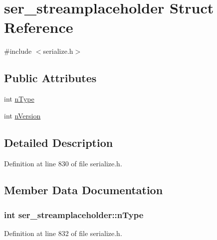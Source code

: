 \hypertarget{structser__streamplaceholder}{}\section{ser\+\_\+streamplaceholder Struct Reference}
\label{structser__streamplaceholder}


{\ttfamily \#include $<$serialize.\+h$>$}

\subsection*{Public Attributes}
\begin{DoxyCompactItemize}
\item 
int \hyperlink{structser__streamplaceholder_a789184cb41dc03b494be3ea0d83d3c3c}{n\+Type}
\item 
int \hyperlink{structser__streamplaceholder_adcc5fb4893156366e8491e37c59ecd87}{n\+Version}
\end{DoxyCompactItemize}


\subsection{Detailed Description}


Definition at line 830 of file serialize.\+h.



\subsection{Member Data Documentation}
\hypertarget{structser__streamplaceholder_a789184cb41dc03b494be3ea0d83d3c3c}{}
\subsubsection[{n\+Type}]{\setlength{\rightskip}{0pt plus 5cm}int ser\+\_\+streamplaceholder\+::n\+Type}\label{structser__streamplaceholder_a789184cb41dc03b494be3ea0d83d3c3c}


Definition at line 832 of file serialize.\+h.

\hypertarget{structser__streamplaceholder_adcc5fb4893156366e8491e37c59ecd87}{}
